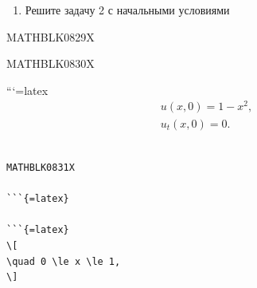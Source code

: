 \documentclass[
]{article}
\providecommand{\tightlist}{%
  \setlength{\itemsep}{0pt}\setlength{\parskip}{0pt}}
\begin{document}
\begin{enumerate}
\def\labelenumi{\arabic{enumi}.}
\setcounter{enumi}{2}
\tightlist
\item
  Решите задачу 2 с начальными условиями
\end{enumerate}

MATHBLK0829X

MATHBLK0830X

```{=latex}
\[
\begin{aligned} u(x, 0) = 1 - x^2, \\ u_t(x, 0) = 0. \end{aligned}
\]

\begin{verbatim}

MATHBLK0831X

```{=latex}

```{=latex}
\[
\quad 0 \le x \le 1,
\]
\end{verbatim}
\end{document}
